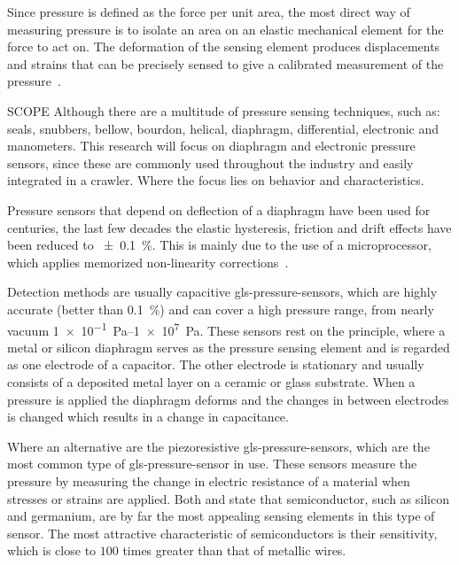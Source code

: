 Since pressure is defined as the force per unit area, the most direct way of measuring pressure is to isolate an area on
an elastic mechanical element for the force to act on. The deformation of the sensing element produces displacements and
strains that can be precisely sensed to give a calibrated measurement of the pressure~\cite{webster_measurement_1999}.

\begin{RoyalNote}{SCOPE}
	Although there are a multitude of pressure sensing techniques, such as: seals, snubbers, bellow, bourdon, helical,
	diaphragm,  differential, electronic and manometers. This research will focus on diaphragm and electronic pressure
	sensors, since  these are commonly used throughout the industry and easily integrated in a crawler. Where the focus
	lies on behavior and characteristics.
\end{RoyalNote}

Pressure sensors that depend on deflection of a diaphragm have been used for centuries, the last few decades the elastic
hysteresis, friction and drift effects have been reduced to \SI{\pm 0.1}{\percent}. This is mainly due to the use of a
microprocessor, which applies memorized non-linearity corrections~\cite{liptak_instrument_2003}.

Detection methods are usually capacitive \gls{gls-pressure-sensor}s, which are highly accurate (better than
\SI{0.1}{\percent}) and can cover a high pressure range, from nearly vacuum \SIrange{1e-1}{1e7}{\pascal}. These sensors
rest on the principle, where a metal or silicon diaphragm serves as the pressure sensing element and is regarded as one
electrode of a capacitor. The other electrode is stationary and usually consists of a deposited metal layer on a ceramic
or glass substrate. When a pressure is applied the diaphragm deforms and the changes in between electrodes is changed
which results in a change in capacitance.

Where an alternative are the piezoresistive \gls{gls-pressure-sensor}s, which are the most common type of
\gls{gls-pressure-sensor} in use. These sensors measure the pressure by measuring the change in electric resistance of a
material when stresses or strains are applied. Both \citet{webster_measurement_1999} and \citet{liptak_instrument_2003}
state that semiconductor, such as silicon and germanium, are by far the most appealing sensing elements in this type of
sensor. The most attractive characteristic of semiconductors is their sensitivity, which is close to \( 100 \) times
greater than that of metallic wires.

